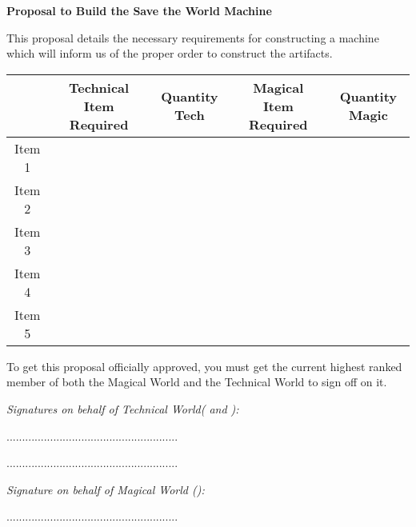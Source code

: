 \documentclass[white]{guildcamp3}
\begin{document}
\name{\wProposal{}} %
\large\textbf{Proposal to Build the Save the World Machine}  


This proposal details the necessary requirements for constructing a machine which will inform us of the proper order to construct the artifacts. 


\begin{tabular}{|c|c|c|c|c|}
	\hline \rule[-2ex]{0pt}{5.5ex}  & Technical Item Required & Quantity Tech & Magical Item Required & Quantity Magic \\ 
	\hline \rule[-2ex]{0pt}{5.5ex} Item 1 &  &  &  &  \\ 
	\hline \rule[-2ex]{0pt}{5.5ex} Item 2 &  &  &  &  \\ 
	\hline \rule[-2ex]{0pt}{5.5ex} Item 3 &  &  &  &  \\ 
	\hline \rule[-2ex]{0pt}{5.5ex} Item 4 &  &  &  &  \\ 
	\hline \rule[-2ex]{0pt}{5.5ex} Item 5 &  &  &  &  \\ 
	\hline 
\end{tabular} 

To get this proposal officially approved, you must get the current highest ranked member of both the Magical World and the Technical World to sign off on it. 



\emph{Signatures on behalf of Technical World(\cPoliOne{\intro} and \cPoliTwo{\intro}): }
	
	.......................................................
	
	.......................................................

\emph{Signature on behalf of Magical World (\cNobleOne{\intro}):}
	

	.......................................................


\end{document}
